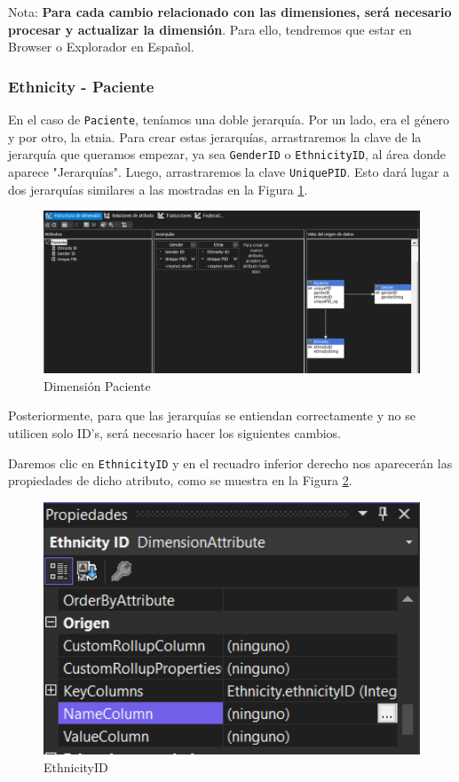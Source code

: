 \documentclass[12pt, a4paper, twoside]{article}
\begin{document}
Nota: \textbf{Para cada cambio relacionado con las dimensiones, será necesario procesar y actualizar la dimensión}. Para ello, tendremos que estar en Browser o Explorador en Español.

\subsubsection{Ethnicity - Paciente}

En el caso de \texttt{Paciente}, teníamos una doble jerarquía. Por un lado, era el género y por otro, la etnia. Para crear estas jerarquías, arrastraremos la clave de la jerarquía que queramos empezar, ya sea \texttt{GenderID} o \texttt{EthnicityID}, al área donde aparece "Jerarquías". Luego, arrastraremos la clave \texttt{UniquePID}. Esto dará lugar a dos jerarquías similares a las mostradas en la Figura \ref{fig:11}.

\begin{figure}[H]
	\centering
	\includegraphics[width=1\textwidth]{image/dimPaciente}
	\caption{Dimensión Paciente}
	\label{fig:11}
\end{figure}

Posteriormente, para que las jerarquías se entiendan correctamente y no se utilicen solo ID's, será necesario hacer los siguientes cambios.

Daremos clic en \texttt{EthnicityID} y en el recuadro inferior derecho nos aparecerán las propiedades de dicho atributo, como se muestra en la Figura \ref{fig:12}.

\begin{figure}[H]
	\centering
	\includegraphics[width=1\textwidth]{image/EthnicityID}
	\caption{EthnicityID}
	\label{fig:12}
\end{figure}
\end{document}
